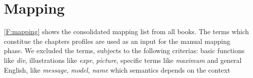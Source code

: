 \section{Mapping}
\label{S:Mapping}

\autoref{F:mapping} shows the consolidated mapping list from all books. The terms which constitue the chapters profiles are used as an input for the manual mapping phase. We excluded the terms, subjects to the following criterias: basic functions like \textit{div}, illustrations like \textit{expr}, \textit{picture}, specific terms like \textit{maximum} and general English, like \textit{message}, \textit{model}, \textit{name} which semantics depends on the context 
 

